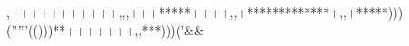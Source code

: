 ,+++++++++++,,                                   ,+++*****++++,,+*************+,                                       ,+*****)))('''''(()))**+++++++,                               ,***)))('&&%